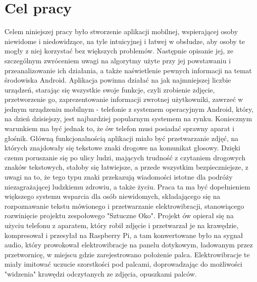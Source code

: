 \documentclass[eng,oneside]{mgr}
\begin{document}
\section{Cel pracy}
Celem niniejszej pracy było stworzenie aplikacji mobilnej, wspierającej osoby niewidome i niedowidzące, na tyle intuicyjnej i łatwej w obsłudze, aby osoby te mogły z niej korzystać bez większych problemów. Następnie opisanie jej, ze szczególnym zwróceniem uwagi na algorytmy użyte przy jej powstawaniu i przeanalizowanie ich działania, a także naświetlenie pewnych informacji na temat środowiska Android. Aplikacja powinna działać na jak najmniejszej liczbie urządzeń, starając się wszystkie swoje funkcje, czyli zrobienie zdjęcie, przetworzenie go, zaprezentowanie informacji zwrotnej użytkowniki, zawrzeć w jednym urządzeniu mobilnym - telefonie z systemem operacyjnym Android, który, na dzień dzisiejszy, jest najbardziej popularnym systemem na rynku. Koniecznym warunkiem ma być jednak to, że ów telefon musi posiadać sprawny aparat i głośnik. Główną funkcjonalnością aplikacji miało być przetwarzanie zdjęć, na których znajdowały się tekstowe znaki drogowe na komunikat głosowy. Dzięki czemu poruszanie się po ulicy ludzi, mających trudność z czytaniem drogowych znaków tekstowych, stałoby się łatwiejsze, a przede wszystkim bezpieczniejsze, z uwagi na to, że tego typu znaki przekazują wiadomości istotne dla podróży niezagrażającej ludzkiemu zdrowiu, a także życiu. Praca ta ma być dopełnieniem większego systemu wsparcia dla osób niewidomych, składającego się na rozpoznawanie tekstu mówionego i przetwarzanie elektrowibracji, stanowiącego rozwinięcie projektu zespołowego "Sztuczne Oko". Projekt ów opierał się na użyciu telefonu z aparatem, który robił zdjęcie i przetwarzał je na krawędzie, kompresował i przesyłał na Raspberry Pi, a tam konwertowane było na sygnał audio, który prowokował elektrowibracje na panelu dotykowym, ładowanym przez przetwornicę, w miejscu gdzie zarejestrowano położenie palca. Elektrowibracje te miały imitować uczucie szorstkości pod palcami, doprowadzając do możliwości "widzenia" krawędzi odczytanych ze zdjęcia, opuszkami palców.
\end{document}
